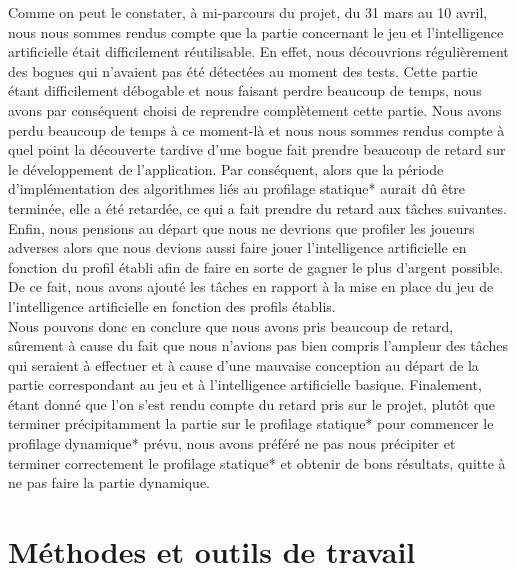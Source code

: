 \documentclass{report}
\begin{document}
Comme on peut le constater, à mi-parcours du projet, du 31 mars au 10 avril, nous nous sommes rendus compte que la partie concernant le jeu et l'intelligence artificielle était difficilement réutilisable. En effet, nous découvrions régulièrement des bogues qui n'avaient pas été détectées au moment des tests. Cette partie étant difficilement débogable et nous faisant perdre beaucoup de temps, nous avons par conséquent choisi de reprendre complètement cette partie. Nous avons perdu beaucoup de temps à ce moment-là et nous nous sommes rendus compte à quel point la découverte tardive d'une bogue fait prendre beaucoup de retard sur le développement de l'application. Par conséquent, alors que la période d'implémentation des algorithmes liés au profilage statique* aurait dû être terminée, elle a été retardée, ce qui a fait prendre du retard aux tâches suivantes.\\

Enfin, nous pensions au départ que nous ne devrions que profiler les joueurs adverses alors que nous devions aussi faire jouer l'intelligence artificielle en fonction du profil établi afin de faire en sorte de gagner le plus d'argent possible. De ce fait, nous avons ajouté les tâches en rapport à la mise en place du jeu de l'intelligence artificielle en fonction des profils établis. \\

Nous pouvons donc en conclure que nous avons pris beaucoup de retard, sûrement à cause du fait que nous n'avions pas bien compris l'ampleur des tâches qui seraient à effectuer et à cause d'une mauvaise conception au départ de la partie correspondant au jeu et à l'intelligence artificielle basique. Finalement, étant donné que l'on s'est rendu compte du retard pris sur le projet, plutôt que terminer précipitamment la partie sur le profilage statique* pour commencer le profilage dynamique* prévu, nous avons préféré ne pas nous précipiter et terminer correctement le profilage statique* et obtenir de bons résultats, quitte à ne pas faire la partie dynamique. \par

\section{Méthodes et outils de travail}
\end{document}
